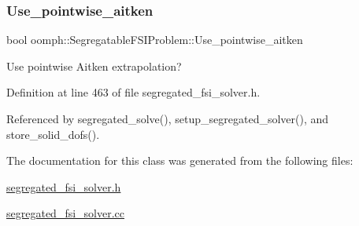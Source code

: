 \subsubsection{\texorpdfstring{Use\+\_\+pointwise\+\_\+aitken}{Use\_pointwise\_aitken}}
{\footnotesize\ttfamily bool oomph\+::\+Segregatable\+F\+S\+I\+Problem\+::\+Use\+\_\+pointwise\+\_\+aitken\hspace{0.3cm}{\ttfamily [protected]}}



Use pointwise Aitken extrapolation? 



Definition at line 463 of file segregated\+\_\+fsi\+\_\+solver.\+h.



Referenced by segregated\+\_\+solve(), setup\+\_\+segregated\+\_\+solver(), and store\+\_\+solid\+\_\+dofs().



The documentation for this class was generated from the following files\+:\begin{DoxyCompactItemize}
\item 
\hyperlink{segregated__fsi__solver_8h}{segregated\+\_\+fsi\+\_\+solver.\+h}\item 
\hyperlink{segregated__fsi__solver_8cc}{segregated\+\_\+fsi\+\_\+solver.\+cc}\end{DoxyCompactItemize}
